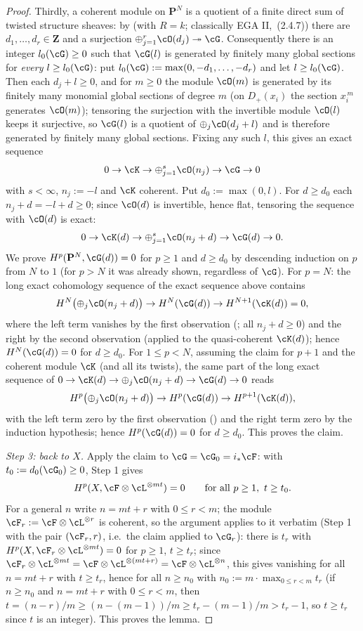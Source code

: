 \begin{proof}
Thirdly, a coherent module on $\mathbf P^N$ is a quotient of a finite
direct sum of twisted structure sheaves: by
 (with $R=k$; classically
EGA II, \,(2.4.7)) there are $d_1,\dots,d_r\in\mathbf Z$ and a
surjection $\oplus_{j=1}^{r}\cO(d_j)\twoheadrightarrow\cG$.
Consequently there is an integer $l_0(\cG)\ge0$ such that $\cG(l)$ is
generated by finitely many global sections for \emph{every}
$l\ge l_0(\cG)$: put $l_0(\cG):=\max(0,-d_1,\dots,-d_r)$ and let
$l\ge l_0(\cG)$.  Then each $d_j+l\ge0$, and for $m\ge0$ the module
$\cO(m)$ is generated by its finitely many monomial global sections of
degree $m$ (on $D_+(x_i)$ the section $x_i^{\,m}$ generates $\cO(m)$);
tensoring the surjection with the invertible module $\cO(l)$ keeps it
surjective, so $\cG(l)$ is a quotient of $\oplus_{j}\cO(d_j+l)$ and is
therefore generated by finitely many global sections.
Fixing any such $l$, this gives an exact sequence
\[
0\to\cK\to\oplus_{j=1}^{s}\cO(n_j)\to\cG\to0
\]
with $s<\infty$, $n_j:=-l$ and $\cK$ coherent.  Put
$d_0:=\max(0,l)$.  For $d\ge d_0$ each $n_j+d=-l+d\ge0$; since
$\cO(d)$ is invertible, hence flat, tensoring the sequence with
$\cO(d)$ is exact:
\[
0\to\cK(d)\to\oplus_{j=1}^{s}\cO(n_j+d)\to\cG(d)\to0 .
\]
We prove $H^p(\mathbf P^N,\cG(d))=0$ for $p\ge1$ and $d\ge d_0$ by
descending induction on $p$ from $N$ to $1$ (for $p>N$ it was already
shown, regardless of $\cG$).  For $p=N$: the long exact cohomology
sequence of the exact sequence above contains
\[
H^N\bigl(\oplus_j\cO(n_j+d)\bigr)\to H^N(\cG(d))
\to H^{N+1}(\cK(d))=0 ,
\]
where the left term vanishes by the first observation
(; all
$n_j+d\ge0$) and the right by the second observation (applied to the
quasi-coherent $\cK(d)$); hence $H^N(\cG(d))=0$ for $d\ge d_0$.  For
$1\le p<N$, assuming the claim for $p+1$ and the coherent module
$\cK$ (and all its twists), the same part of the long exact sequence
of $0\to\cK(d)\to\oplus_j\cO(n_j+d)\to\cG(d)\to0$ reads
\[
H^p\bigl(\oplus_j\cO(n_j+d)\bigr)\to H^p(\cG(d))
\to H^{p+1}(\cK(d)),
\]
with the left term zero by the first observation
() and the right
term zero by the induction hypothesis; hence $H^p(\cG(d))=0$ for
$d\ge d_0$.  This proves the claim.

\emph{Step 3: back to $X$.}  Apply the claim to $\cG=\cG_0=i_*\cF$:
with $t_0:=d_0(\cG_0)\ge0$, Step 1 gives
\[
H^p(X,\cF\otimes\cL^{\otimes mt})=0\qquad\text{for all }p\ge1,\ t\ge t_0 .
\]
For a general $n$ write $n=mt+r$ with $0\le r<m$; the module
$\cF_r:=\cF\otimes\cL^{\otimes r}$ is coherent, so the argument
applies to it verbatim (Step 1 with the pair $(\cF_r,r)$, i.e.\ the
claim applied to $\cG_r$): there is $t_r$ with
$H^p(X,\cF_r\otimes\cL^{\otimes mt})=0$ for $p\ge1$, $t\ge t_r$;
since $\cF_r\otimes\cL^{\otimes mt}
=\cF\otimes\cL^{\otimes(mt+r)}=\cF\otimes\cL^{\otimes n}$, this gives
vanishing for all $n=mt+r$ with $t\ge t_r$, hence for all
$n\ge n_0$ with
$n_0:=m\cdot\max_{0\le r<m}t_r$  (if $n\ge n_0$ and $n=mt+r$ with
$0\le r<m$, then
$t=(n-r)/m\ge(n-(m-1))/m\ge t_r-(m-1)/m>t_r-1$, so $t\ge t_r$ since
$t$ is an integer).  This proves the lemma.
\end{proof}




